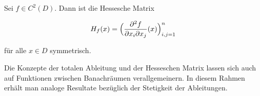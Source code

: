 \begin{korollar}
Sei $f\in C^2(D)$. Dann ist die Hessesche Matrix


$$
H_f(x)=\Bigl( \frac{\partial^2 f}{\partial x_i \partial x_j}(x)\Bigr)_{i,j=1}^n
$$


für alle $x\in D$ symmetrisch.
\end{korollar}

\begin{bemerkungbox}
Die Konzepte der totalen Ableitung und der Hesseschen Matrix lassen sich auch auf Funktionen zwischen Banachräumen verallgemeinern. In diesem Rahmen erhält man analoge Resultate bezüglich der Stetigkeit der Ableitungen.
\end{bemerkungbox}
